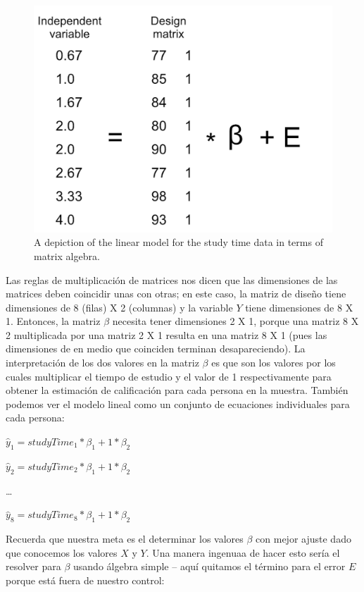 \documentclass[
  12pt,
]{book}
\theoremstyle{definition}
\theoremstyle{definition}
\theoremstyle{definition}
\theoremstyle{remark}
\begin{document}
\begin{figure}
\includegraphics[width=16.67in]{images/glm_matrix} \caption{A depiction of the linear model for the study time data in terms of matrix algebra.}\label{fig:GLMmatrix}
\end{figure}

Las reglas de multiplicación de matrices nos dicen que las dimensiones de las matrices deben coincidir unas con otras; en este caso, la matriz de diseño tiene dimensiones de 8 (filas) X 2 (columnas) y la variable \(Y\) tiene dimensiones de 8 X 1. Entonces, la matriz \(\beta\) necesita tener dimensiones 2 X 1, porque una matriz 8 X 2 multiplicada por una matriz 2 X 1 resulta en una matriz 8 X 1 (pues las dimensiones de en medio que coinciden terminan desapareciendo). La interpretación de los dos valores en la matriz \(\beta\) es que son los valores por los cuales multiplicar el tiempo de estudio y el valor de 1 respectivamente para obtener la estimación de calificación para cada persona en la muestra. También podemos ver el modelo lineal como un conjunto de ecuaciones individuales para cada persona:

\(\hat{y}_1 = studyTime_1*\beta_1 + 1*\beta_2\)

\(\hat{y}_2 = studyTime_2*\beta_1 + 1*\beta_2\)

\ldots{}

\(\hat{y}_8 = studyTime_8*\beta_1 + 1*\beta_2\)

Recuerda que nuestra meta es el determinar los valores \(\beta\) con mejor ajuste dado que conocemos los valores \(X\) y \(Y\). Una manera ingenuaa de hacer esto sería el resolver para \(\beta\) usando álgebra simple -- aquí quitamos el término para el error \(E\) porque está fuera de nuestro control:
\end{document}
